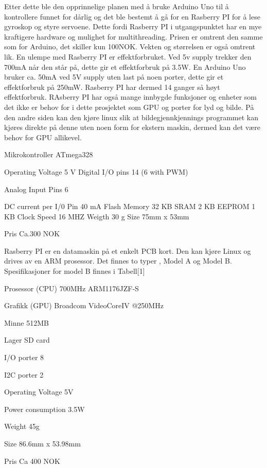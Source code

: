 Etter dette ble den opprinnelige planen med å bruke Arduino Uno til å kontrollere funnet for dårlig og det ble bestemt å gå for en Rasberry PI for å lese gyroskop og styre servoene. Dette fordi Rasberry PI i utgangspunktet har en mye kraftigere hardware og mulighet for multithreading. Prisen er omtrent den samme som for Arduino, det skiller kun 100NOK. Vekten og størrelsen er også omtrent lik. En ulempe med Rasberry PI er effektforbruket. Ved 5v supply trekker den 700mA når den står på, dette gir et effektforbruk på 3.5W. En Arduino Uno bruker ca. 50mA ved 5V supply uten last på noen porter, dette gir et effektforbruk på 250mW. Rasberry PI har dermed 14 ganger så høyt effektforbruk. RAsberry PI har også mange innbygde funksjoner og enheter som det ikke er behov for i dette prosjektet som GPU og porter for lyd og bilde. På den andre siden kan den kjøre linux slik at bildegjennkjennings programmet kan kjøres direkte på denne uten noen form for ekstern maskin, dermed kan det være behov for GPU allikevel.  


Mikrokontroller
ATmega328

Operating Voltage
5
V
Digital I/O pins
14 (6 with PWM)

Analog Input Pins
6

DC current per I/0 Pin
40
mA
Flash Memory
32
KB
SRAM
2
KB
EEPROM
1
KB
Clock Speed
16
MHZ
Weigth
30
g
Size
75mm x 53mm

Pris
 Ca.300 NOK



 
Rasberry PI er en datamaskin på et enkelt PCB kort. Den kan kjøre Linux og drives av en ARM prosessor. Det finnes to typer , Model A og Model B. Spesifikasjoner for model B finnes i Tabell[1]

Prosessor (CPU)
700MHz ARM1176JZF-S

Grafikk (GPU)
Broadcom VideoCoreIV @250MHz

Minne
512MB

Lager
SD card

I/O porter
8

I2C porter
2

Operating Voltage
5V

Power consumption
3.5W

Weight
45g

Size
86.6mm x 53.98mm

Pris
Ca 400 NOK




